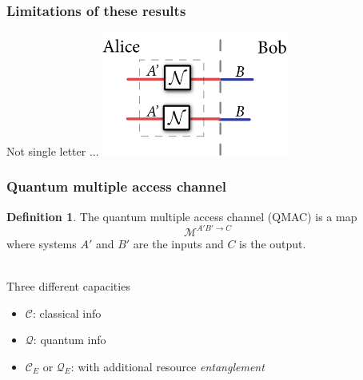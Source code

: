 \documentclass[12pt]{beamer}
\newcommand{\mcal}{\mathcal}
\newcommand{\be}{\begin{equation}}
\newcommand{\ee}{\end{equation}}
\theoremstyle{plain}
\newtheorem{Th}{Theorem}[section]
\theoremstyle{definition}
\newtheorem{Def}[Th]{Definition}
\begin{document}
%    
%    



\begin{frame}
	\frametitle{Limitations of these results}
	Not single letter ... 
         \includegraphics[height=1.6in]{mark_diagrams/notSingleLetter.png}
\end{frame}



\begin{frame}
	\frametitle{Quantum multiple access channel}

		\begin{Def} The quantum multiple access channel (QMAC) is a map
		\be
			\mcal{M}^{A'B' \to C}
		\ee
		where systems $A'$ and $B'$ are the inputs and $C$ is the output.
		\end{Def}    
		\ \\
		Three different capacities
		\begin{itemize}
			\item $\mcal{C}$: classical info
			\item $\mcal{Q}$: quantum info
			\item $\mcal{C}_E$  or $\mcal{Q}_E$: with additional resource \emph{entanglement}
		\end{itemize}
		
		
\end{frame}
\end{document}
